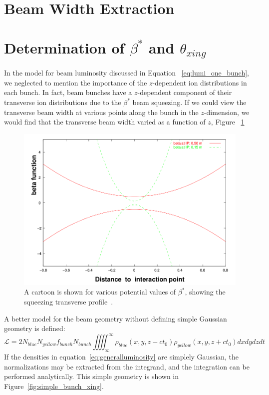 \clearpage
\section{Beam Width Extraction}
\label{sec:beam_width}

\clearpage
\section{Determination of $\beta^*$ and $\theta_{xing}$}
\label{sec:hourglass_correction}

In the model for beam luminosity discussed in Equation ~\ref{eq:lumi_one_bunch},
we neglected to  mention the importance of the $z$-dependent ion distributions
in each bunch. In fact, beam bunches have a $z$-dependent component of their
transverse ion distributions due to the $\beta^*$ beam squeezing. If we could
view the transverse beam width at various points along the bunch in the
$z$-dimension, we would find that the transverse beam width varied as a function
of $z$, Figure ~\ref{fig:beta_squeeze}

\begin{figure}[h]
  \centering
  \includegraphics[width=0.8\linewidth]{./figures/beta_function.png}
  \caption{
    A cartoon is shown for various potential values of $\beta^*$, showing the
    squeezing transverse profile~\cite{Herr2003a}.
  }
  \label{fig:beta_squeeze}

\end{figure}

A better model for the beam geometry without defining simple Gaussian geometry
is defined:
\begin{equation}
\label{eq:generalluminosity}
\mathcal{L} = 2N_{blue}N_{yellow}f_{bunch}N_{bunch}\iiiint _{\infty}^{ \infty}{
\rho_{blue} (x,y,z-ct_0)\rho_{yellow} (x,y,z+ct_0)} dxdydzdt
\end{equation}
If the densities in equation~\ref{eq:generalluminosity} are simplely Gaussian,
the normalizations may be extracted from the integrand, and the integration can
be performed analytically. This simple geometry is shown in
Figure~\ref{fig:simple_bunch_xing}.

